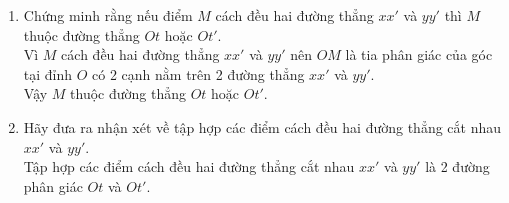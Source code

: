\begin{bt}
{\begin{enumerate}
			\begin{itemize}
				\item Vì $M$ thuộc $Ot$ là tia phân giác của $\widehat{xOy}$ nên $M$ cách đều $Ox$ và $Oy$.\\
				Vậy $M$ cách đều $xx'$ và $yy'$.
				\item Vì $M$ thuộc $Ot'$ là tia phân giác của $\widehat{x'Oy}$ nên $M$ cách đều $Ox'$ và $Oy$.\\
				Vậy $M$ cách đều $xx'$ và $yy'$.
			\end{itemize}
			\item Chứng minh rằng nếu điểm $M$ cách đều hai đường thẳng $xx'$ và $yy'$ thì $M$ thuộc đường thẳng $Ot$ hoặc $Ot'$.\\
			Vì $M$ cách đều hai đường thẳng $xx'$ và $yy'$ nên $OM$ là tia phân giác của góc tại đỉnh $O$ có 2 cạnh nằm trên 2 đường thẳng $xx'$ và $yy'$.\\
			Vậy $M$ thuộc đường thẳng $Ot$ hoặc $Ot'$.
			\item Hãy đưa ra nhận xét về tập hợp các điểm cách đều hai đường thẳng cắt nhau $xx'$ và $yy'$.\\
			Tập hợp các điểm cách đều hai đường thẳng cắt nhau $xx'$ và $yy'$ là 2 đường phân giác $Ot$ và $Ot'$.
		\end{enumerate}
	}
\end{bt}
